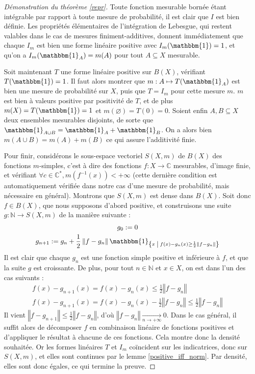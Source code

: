 \documentclass[a4paper,12pt]{article}
\newcommand{\N}{\mathbb{N}}
\newcommand{\C}{\mathbb{C}}
\newcommand{\norm}[1]{\left\Vert #1\right\Vert}
\newcommand{\set}[1]{\left\{ #1 \right\}}
\newcommand{\indic}{\mathbbm{1}}
\newcommand{\tq}{\;\middle|\;}
\newcommand{\inv}{^{-1}}
\begin{document}
\begin{proof}[Démonstration du théorème \ref{repr}]
    Toute fonction mesurable bornée étant intégrable par rapport à toute mesure de probabilité, il est clair que $I$ est bien définie. 
    Les propriétés élémentaires de l'intégration de Lebesgue, qui restent valables dans le cas de mesures finiment-additives,
    donnent immédiatement que chaque $I_m$ est bien une forme linéaire positive avec $I_m(\indic) = 1$, et qu'on a
    $I_m(\indic_A) = m(A)$ pour tout $A\subseteq X$ mesurable.

    Soit maintenant $T$ une forme linéaire positive sur $B(X)$, vérifiant $T(\indic) = 1$.
    Il faut alors montrer que $m : A\mapsto T(\indic_A)$ est bien une mesure de probabilité sur $X$,
    puis que $T = I_m$ pour cette mesure $m$. $m$ est bien à valeurs positive par positivité de $T$, et 
    de plus $m(X) = T(\indic) = 1$ et $m(\varnothing) = T(0) = 0$. Soient enfin $A, B\subseteq X$ deux ensembles
    mesurables disjoints, de sorte que $\indic_{A\cup B} = \indic_A + \indic_B$. On a alors bien 
    $m(A\cup B) = m(A) + m(B)$ ce qui assure l'additivité finie. 

    Pour finir, considérons le sous-espace vectoriel $S(X, m)$ de $B(X)$ des fonctions $m$-simples, c'est à dire des 
    fonctions $f:X\to\C$ mesurables, d'image finie, et vérifiant $\forall c\in\C^*, m(f\inv(x)) < +\infty$ (cette dernière 
    condition est automatiquement vérifiée dans notre cas d'une mesure de probabilité, mais nécessaire en général).
    Montrons que $S(X, m)$ est dense dans $B(X)$. Soit donc $f\in B(X)$, que nous supposons d'abord positive, et construisons 
    une suite $g:\N\to S(X, m)$ de la manière suivante :
    \begin{gather*}
        g_0 := 0 \\
        g_{n+1} := g_n + \frac12\norm{f - g_n}\indic_{\set{x\tq f(x) - g_n(x) \ge \frac12\norm{f - g_n}}}
    \end{gather*}
    Il est clair que chaque $g_n$ est une fonction simple positive et inférieure à $f$, et que la suite $g$ est croissante.
    De plus, pour tout $n\in\N$ et $x\in X$, on est dans l'un des cas suivants : 
    \begin{gather*}
        f(x)-g_{n+1}(x) = f(x)-g_n(x) \le \frac12\norm{f - g_n} \\
        f(x)-g_{n+1}(x) = f(x)-g_n(x)-\frac12\norm{f-g_n} \le \frac12\norm{f-g_n}
    \end{gather*}
    Il vient $\norm{f - g_{n+1}}\le\frac12\norm{f - g_n}$, d'où $\norm{f - g_n}\xrightarrow[n\to+\infty]{} 0$.
    Dans le cas général, il suffit alors de décomposer $f$ en combinaison linéaire de fonctions positives et d'appliquer 
    le résultat à chacune de ces fonctions. Cela montre donc la densité souhaitée. Or les formes linéaires $T$ et $I_m$
    coïncident sur les indicatrices, donc sur $S(X, m)$, et elles sont continues par le lemme \ref{positive_iff_norm}. 
    Par densité, elles sont donc égales, ce qui termine la preuve.
\end{proof}
\end{document}

